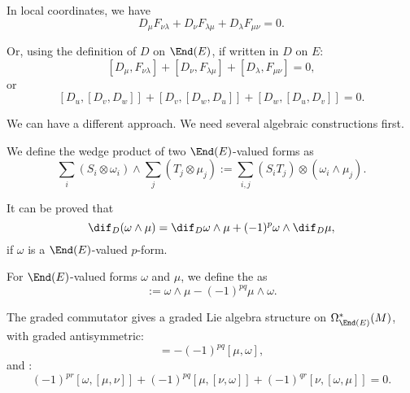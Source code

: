 \documentclass[openany, oneside, a5paper]{book}
\begin{document}
In local coordinates, we have
\begin{equation}
    D_\mu F_{\nu \lambda} + D_\nu F_{\lambda \mu} + D_\lambda F_{\mu \nu} = 0.
\end{equation}

Or, using the definition of $D$ on $\End(E)$, if written in $D$ on $E$:
\begin{equation}\label{eq: Bianchi identity (D and F, local coordinates)}
    [D_\mu, F_{\nu \lambda}] + [D_\nu, F_{\lambda \mu}] + [D_\lambda, F_{\mu \nu}] = 0,
\end{equation}
or
\begin{equation}\label{eq: Bianchi identity (D, local coordinates)}
    [D_u, [D_v, D_w]] + [D_v, [D_w, D_u]] + [D_w, [D_u, D_v]] = 0.
\end{equation}

We can have a different approach.
We need several algebraic constructions first.

We define the wedge product of two $\End(E)$-valued forms as
\begin{equation}
    \sum_i (S_i \otimes \omega_i) \wedge \sum_j(T_j \otimes \mu_j) 
    := \sum_{i, j} (S_i T_j) \otimes (\omega_i \wedge \mu_j).
\end{equation}


It can be proved that
\begin{equation}
    \dif_D (\omega \wedge \mu) = \dif_D \omega \wedge \mu + (-1)^p \omega \wedge \dif_D \mu,
\end{equation}
if $\omega$ is a $\End(E)$-valued $p$-form.

\begin{definition}
    For $\End(E)$-valued forms $\omega$ and $\mu$, we define the  as
    \begin{equation}
        [\omega, \mu] := \omega \wedge \mu - (-1)^{pq} \mu \wedge \omega.
    \end{equation}
\end{definition}

The graded commutator gives a graded Lie algebra structure on $\Omega^*_{\End(E)}(M)$, with graded antisymmetric:
\begin{equation}
    [\omega, \mu] = - (-1)^{pq} [\mu, \omega],
\end{equation}
and :
\begin{equation}
    (-1)^{pr} [\omega, [\mu, \nu]] + (-1)^{pq} [\mu, [\nu, \omega]] + (-1)^{qr} [\nu, [\omega, \mu]] = 0.
\end{equation}
\end{document}
